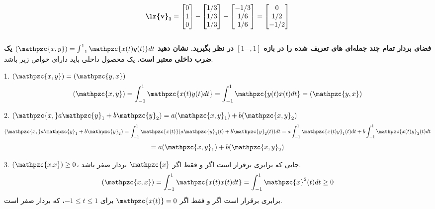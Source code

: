 \documentclass[a4paper,12pt]{report}
\begin{document}
      	 $$
         \textbf{\lr{v}}_3=
         \begin{bmatrix}
         	0 \\ 1 \\ 0
         \end{bmatrix}
         -
         \begin{bmatrix}
         	1/3 \\ 1/3 \\ 1/3
         \end{bmatrix}
     	 -
     	 \begin{bmatrix}
     	 	-1/3 \\ 1/6 \\ 1/6
     	 \end{bmatrix}
         =
         \begin{bmatrix}
         	0 \\ 1/2 \\ -1/2
         \end{bmatrix}
         $$\\
         
         \hspace{-2cm}\textbf{}
         \textbf
         {
         	فضای بردار تمام چند جمله‌ای های تعریف شده را در بازه
         	$ [1- , 1]  $ در نظر بگیرید. نشان دهید 
         	$ (\mathpzc{x,y})=\int_{-1}^{1}\mathpzc{x(t)y(t)}dt $          
         	یک ضرب داخلی معتبر است.
         }         
         یک محصول داخلی باید دارای خواص زیر باشد.
         
         1. $ (\mathpzc{x,y})=(\mathpzc{y,x}) $
         $$
         (\mathpzc{x,y})=\int_{-1}^1\mathpzc{x(t)y(t)dt}=
         \int_{-1}^1\mathpzc{y(t)x(t)dt}=(\mathpzc{y,x})
         $$
         
         2. $ (\mathpzc{x,}a\mathpzc{y}_1+b\mathpzc{y}_2)=
         a(\mathpzc{x,y}_1)+b(\mathpzc{x,y}_2) $
         $$
         (\mathpzc{x,}a\mathpzc{y}_1+b\mathpzc{y}_2)=
         \int_{-1}^1\mathpzc{x(t)}(a\mathpzc{y}_1(t)+b\mathpzc{y}_2(t))dt=
         a\int_{-1}^{1}\mathpzc{x(t)y}_1(t)dt+
         b\int_{-1}^{1}\mathpzc{x(t)y}_2(t)dt                 
         $$
         $$
         =a(\mathpzc{x,y}_1)+b(\mathpzc{x,y}_2) 
         $$
         
         3. $ (\mathpzc{x.x}) \geq 0 $،
         جایی که برابری برقرار است اگر و فقط اگر $ \mathpzc{x} $ بردار صفر باشد.
         $$
         (\mathpzc{x,x})=\int_{-1}^{1}\mathpzc{x(t)x(t)dt}=
         \int_{-1}^{1}\mathpzc{x}^2(t)dt \geq 0
         $$
         برابری برقرار است اگر و فقط اگر 
         $ \mathpzc{x(t)}=0 $
         برای
         $ -1 \leq t \leq 1 $،
         که بردار صفر است.\\
         
\end{document}

